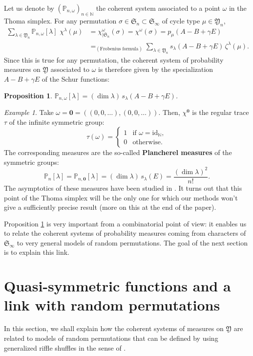 \documentclass[smallextended,nospthms]{svjour3}
\newtheorem{proposition}[theorem]{Proposition}
\theoremstyle{remark}
\newtheorem*{example}{Example}
\newcommand{\N}{\mathbb{N}}
\newcommand{\sym}{\mathfrak{S}}
\newcommand{\ym}{\mathfrak{Y}}
\newcommand{\proba}{\mathbb{P}}
\newcommand{\id}{\mathrm{id}}
\begin{document}
Let us denote by $(\proba_{n,\omega})_{n\in \N}$ the coherent system associated to a point $\omega$ in the Thoma simplex. For any permutation $\sigma \in \sym_{n}\subset \sym_{\infty}$ of cycle type $\mu \in \ym_{n}$,
\begin{align*}
\sum_{\lambda \in \ym_{n}}\proba_{n,\omega}[\lambda]\,\,\chi^{\lambda}(\mu)&=\chi^{\omega}_{|\sym_{n}}(\sigma)=\chi^{\omega}(\sigma)=p_{\mu}(A-B+\gamma E)\\
&=_{(\text{Frobenius formula})} \sum_{\lambda \in \ym_{n}} s_{\lambda}(A-B+\gamma E)\,\zeta^{\lambda}(\mu).
\end{align*}
Since this is true for any permutation, the coherent system of probability measures on $\ym$ associated to $\omega$ is therefore given by the specialization $A-B+\gamma E$ of the Schur functions:
\begin{proposition}\label{csspezialschur}
$\proba_{n,\omega}[\lambda]=(\dim \lambda)\,s_{\lambda}(A-B+\gamma E)$.
\end{proposition}
\begin{example}
Take $\omega=\mathbf{0}=((0,0,\ldots),(0,0,\ldots))$. Then, $\chi^{\mathbf{0}}$ is the regular trace $\tau$ of the infinite symmetric group:
$$\tau(\omega)=\begin{cases}
1 &\text{if }\omega=\id_{\N},\\
0&\text{otherwise}.
\end{cases}$$
The corresponding measures are the so-called \textbf{Plancherel measures} of the symmetric groups:
$$\proba_{n}[\lambda]=\proba_{n,\mathbf{0}}[\lambda]=(\dim\lambda)\,s_{\lambda}(E)=\frac{(\dim \lambda)^{2}}{n!}.$$
The asymptotics of these measures have been studied in \cite{LS77,KV77,Ker93,IO02}. It turns out that this point of the Thoma simplex will be the only one for which our methods won't give a sufficiently precise result (more on this at the end of the paper).
\end{example}\bigskip

Proposition \ref{csspezialschur} is very important from a combinatorial point of view: it enables us to relate the coherent systems of probability measures coming from characters of $\sym_{\infty}$ to very general models of random permutations. The goal of the next section is to explain this link.
\bigskip





\section{Quasi-symmetric functions and a link with random permutations}\label{randompermutation}
In this section, we shall explain how the coherent systems of measures on $\ym$ are related to models of random permutations that can be defined by using generalized riffle shuffles in the sense of \cite{Stan01,Ful02}.
\end{document}
